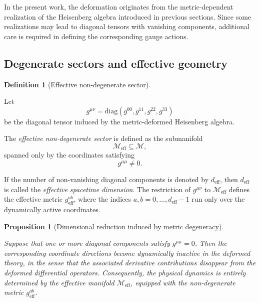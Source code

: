 \documentclass[12pt,a4paper]{article}
\theoremstyle{plain}
\newtheorem{proposition}[theorem]{Proposition}
\theoremstyle{definition}
\newtheorem{definition}[theorem]{Definition}
\begin{document}
In the present work, the deformation originates from the metric-dependent realization of the Heisenberg algebra introduced in previous sections. Since some realizations may lead to diagonal tensors with vanishing components, additional care is required in defining the corresponding gauge actions.

\subsection{Degenerate sectors and effective geometry}

\begin{definition}[Effective non-degenerate sector]
\label{def:effective_sector}

Let
\[
g^{\mu\nu}
=
\mathrm{diag}
\left(
g^{00},
g^{11},
g^{22},
g^{33}
\right)
\]
be the diagonal tensor induced by the metric-deformed Heisenberg algebra.

The \emph{effective non-degenerate sector} is defined as the submanifold
\[
\mathcal{M}_{\mathrm{eff}}
\subseteq
\mathcal{M},
\]
spanned only by the coordinates satisfying
\[
g^{\mu\mu}\neq0.
\]

If the number of non-vanishing diagonal components is denoted by $d_{\mathrm{eff}}$, then \(d_{\mathrm{eff}}\) is called the \emph{effective spacetime dimension}. The restriction of \(g^{\mu\nu}\) to \(\mathcal{M}_{\mathrm{eff}}\) defines the effective metric $
g_{\mathrm{eff}}^{ab}$, where the indices $
a,b=0,\dots,d_{\mathrm{eff}}-1$
run only over the dynamically active coordinates.
\end{definition}

\begin{proposition}[Dimensional reduction induced by metric degeneracy]
\label{prop:dimensional_reduction}

Suppose that one or more diagonal components satisfy $g^{\mu\mu}=0$.
Then the corresponding coordinate directions become dynamically inactive in the deformed theory, in the sense that the associated derivative contributions disappear from the deformed differential operators. Consequently, the physical dynamics is entirely determined by the effective manifold $\mathcal{M}_{\mathrm{eff}}$, equipped with the non-degenerate metric $g_{\mathrm{eff}}^{ab}$.
\end{proposition}
\end{document}
